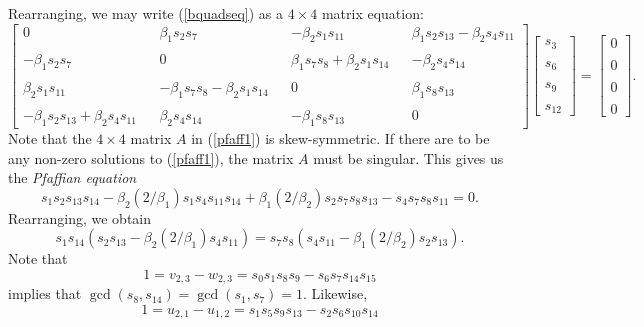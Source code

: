 \documentclass[letterpaper,10pt]{amsart}
\theoremstyle{definition}
\numberwithin{equation}{section}
\begin{document}
Rearranging, we may write (\ref{bquadseq}) as a $4 \times 4$ matrix equation:
\begin{equation} \label{pfaff1} 
\begin{bmatrix} 0 & & \beta_1 s_2 s_7 & & - \beta_2 s_1 s_{11} & & \beta_1 s_2 s_{13} - \beta_2 s_4 s_{11} \\ \\
- \beta_1 s_2 s_7 & & 0 & & \beta_1 s_7 s_8 + \beta_2 s_1 s_{14} & & - \beta_2 s_4 s_{14} \\ \\ 
\beta_2 s_1 s_{11} & &- \beta_1 s_7 s_8 - \beta_2 s_1 s_{14}  & & 0 &  & \beta_1 s_8 s_{13} \\ \\ 
- \beta_1 s_2 s_{13} + \beta_2 s_4 s_{11} & & \beta_2 s_4 s_{14} & & - \beta_1 s_8 s_{13} & & 0 
\end{bmatrix} \begin{bmatrix} s_3 \\ \\ s_6 \\ \\ s_9 \\ \\ s_{12} \end{bmatrix} = \begin{bmatrix} 0 \\ \\ 0 \\ \\ 0 \\ \\ 0 \end{bmatrix}.
\end{equation}
Note that the $4 \times 4$ matrix $A$ in (\ref{pfaff1}) is skew-symmetric. If there are to be any non-zero solutions to (\ref{pfaff1}), the matrix $A$ must be singular. This gives us the \emph{Pfaffian equation}
\begin{equation} \label{pfaffeq} s_1 s_2 s_{13} s_{14} - \beta_2 (2/\beta_1) s_1 s_4 s_{11} s_{14} + \beta_1 (2/\beta_2) s_2 s_7 s_8 s_{13} - s_4 s_7 s_8 s_{11} = 0.
\end{equation}
Rearranging, we obtain 
\begin{equation} \label{pfaffeq2} s_1 s_{14} (s_2 s_{13} - \beta_2 (2/\beta_1) s_4 s_{11}) = s_7 s_8 (s_4 s_{11} - \beta_1 (2/\beta_2) s_2 s_{13}).
\end{equation}
Note that 
\[1 = v_{2,3} - w_{2,3} = s_0 s_1 s_8 s_9 - s_6 s_7 s_{14} s_{15} \]
implies that $\gcd(s_8, s_{14}) = \gcd(s_1, s_7) = 1$. Likewise, 
\[1 = u_{2,1} - u_{1,2} = s_1 s_5 s_9 s_{13} - s_2 s_6 s_{10} s_{14}\]
\end{document}
